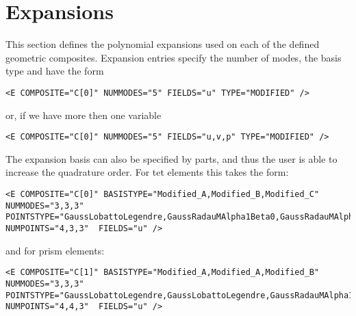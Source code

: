 \section{Expansions}
This section defines the polynomial expansions used on each of the defined geometric composites. Expansion entries specify the number of modes, the basis type and have the form
\begin{lstlisting}[style=XMLStyle]
<E COMPOSITE="C[0]" NUMMODES="5" FIELDS="u" TYPE="MODIFIED" />
\end{lstlisting}
or, if we have more then one variable
\begin{lstlisting}[style=XMLStyle]
<E COMPOSITE="C[0]" NUMMODES="5" FIELDS="u,v,p" TYPE="MODIFIED" />
\end{lstlisting}

The expansion basis can also be specified by parts, and thus the user is able to increase the quadrature order. For tet elements this takes the form:

\begin{lstlisting}[style=XMLStyle]
<E COMPOSITE="C[0]" BASISTYPE="Modified_A,Modified_B,Modified_C" NUMMODES="3,3,3" POINTSTYPE="GaussLobattoLegendre,GaussRadauMAlpha1Beta0,GaussRadauMAlpha2Beta0" NUMPOINTS="4,3,3"  FIELDS="u" />
\end{lstlisting}
and for prism elements:
\begin{lstlisting}[style=XMLStyle]
<E COMPOSITE="C[1]" BASISTYPE="Modified_A,Modified_A,Modified_B" NUMMODES="3,3,3" POINTSTYPE="GaussLobattoLegendre,GaussLobattoLegendre,GaussRadauMAlpha1Beta0" NUMPOINTS="4,4,3"  FIELDS="u" />
\end{lstlisting}
